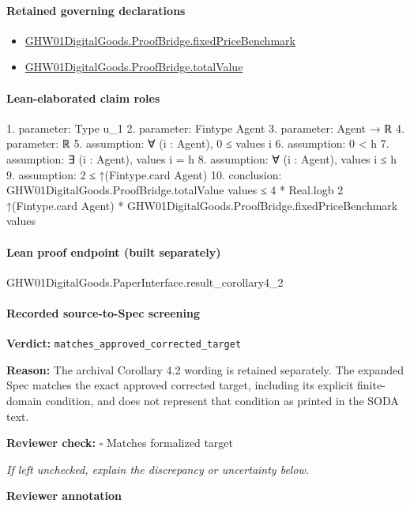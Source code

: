 \documentclass[10pt]{article}
\newcommand{\reviewerbox}{%
  \par\noindent\fbox{\parbox{0.96\linewidth}{\rule{0pt}{0.38in}}}\par
}
\newcommand{\reviewmatch}[1]{%
  \par\noindent\textbf{Reviewer check:} $\square$\; #1\par
  \noindent\emph{If left unchecked, explain the discrepancy or uncertainty below.}\par
}
\begin{document}
\paragraph{Retained governing declarations}
\begin{itemize}\raggedright
\item \hyperlink{governing-declaration-999c32dc6e9adaf2}{GHW01\allowbreak{}Digital\allowbreak{}Goods.\allowbreak{}Proof\allowbreak{}Bridge.\allowbreak{}fixed\allowbreak{}Price\allowbreak{}Benchmark}
\item \hyperlink{paper-prerequisite-1dad2de1fe153716}{GHW01\allowbreak{}Digital\allowbreak{}Goods.\allowbreak{}Proof\allowbreak{}Bridge.\allowbreak{}total\allowbreak{}Value}
\end{itemize}
\paragraph{Lean-elaborated claim roles}\begin{ReviewVerbatim}
1. parameter: Type u_1
2. parameter: Fintype Agent
3. parameter: Agent → ℝ
4. parameter: ℝ
5. assumption: ∀ (i : Agent), 0 ≤ values i
6. assumption: 0 < h
7. assumption: ∃ (i : Agent), values i = h
8. assumption: ∀ (i : Agent), values i ≤ h
9. assumption: 2 ≤ ↑(Fintype.card Agent)
10. conclusion: GHW01DigitalGoods.ProofBridge.totalValue values ≤
  4 * Real.logb 2 ↑(Fintype.card Agent) * GHW01DigitalGoods.ProofBridge.fixedPriceBenchmark values
\end{ReviewVerbatim}

\paragraph{Lean proof endpoint (built separately)}\begin{ReviewVerbatim}
GHW01DigitalGoods.PaperInterface.result_corollary4_2
\end{ReviewVerbatim}

\paragraph{Recorded source-to-Spec screening}
\textbf{Verdict:} \texttt{matches\_approved\_corrected\_target}
\\
{\raggedright
\textbf{Reason:} The archival Corollary 4.\allowbreak{}2 wording is retained separately.\allowbreak{} The expanded Spec matches the exact approved corrected target, including its explicit finite-\allowbreak{}domain condition, and does not represent that condition as printed in the SODA text.\allowbreak{}
\par}
\reviewmatch{Matches formalized target}
\noindent\textbf{Reviewer annotation}\par
\reviewerbox
\clearpage
\hypertarget{source-claim-de03b129c03015d1}{}
\end{document}
